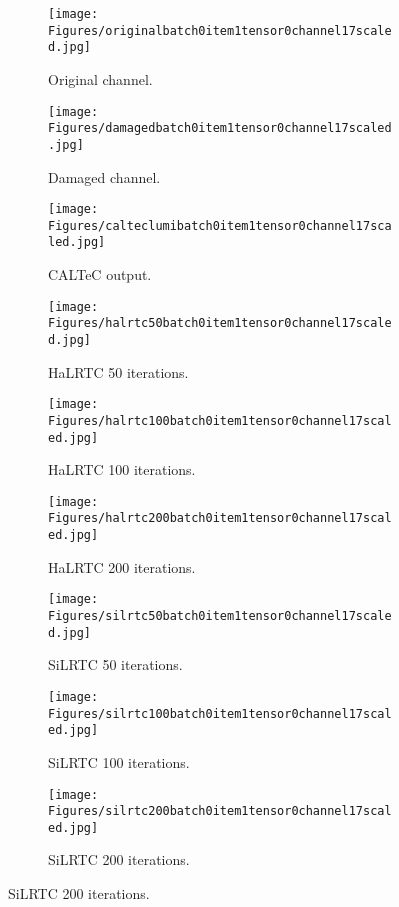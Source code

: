 \begin{figure}[H]
	\centering
	\begin{subfigure}{.32\linewidth}
		\centering
		\texttt{[image: Figures/originalbatch0item1tensor0channel17scaled.jpg]}
		\caption{Original channel.}
	\end{subfigure}%
	\hfill
	\begin{subfigure}{.32\textwidth}
		\centering
		\texttt{[image: Figures/damagedbatch0item1tensor0channel17scaled.jpg]}
		\caption{Damaged channel.}
	\end{subfigure}
	\hfill 
	\begin{subfigure}{.32\textwidth}
		\centering
		\texttt{[image: Figures/calteclumibatch0item1tensor0channel17scaled.jpg]}
		\caption{CALTeC output.}
	\end{subfigure}
	
	\begin{subfigure}{.32\textwidth}
		\centering
		\texttt{[image: Figures/halrtc50batch0item1tensor0channel17scaled.jpg]}
		\caption{HaLRTC 50 iterations.}
	\end{subfigure}
	\hfill 
	\begin{subfigure}{.32\textwidth}
		\centering
		\texttt{[image: Figures/halrtc100batch0item1tensor0channel17scaled.jpg]}
		\caption{HaLRTC 100 iterations.}
	\end{subfigure}
	\hfill
	\begin{subfigure}{.32\textwidth}
		\centering
		\texttt{[image: Figures/halrtc200batch0item1tensor0channel17scaled.jpg]}
		\caption{HaLRTC 200 iterations.}
	\end{subfigure}
	
	\begin{subfigure}{.32\textwidth}
		\centering
		\texttt{[image: Figures/silrtc50batch0item1tensor0channel17scaled.jpg]}
		\caption{SiLRTC 50 iterations.}
	\end{subfigure}
	\hfill 
	\begin{subfigure}{.32\textwidth}
		\centering
		\texttt{[image: Figures/silrtc100batch0item1tensor0channel17scaled.jpg]}
		\caption{SiLRTC 100 iterations.}
	\end{subfigure}
	\hfill
	\begin{subfigure}{.32\textwidth}
		\centering
		\texttt{[image: Figures/silrtc200batch0item1tensor0channel17scaled.jpg]}
		\caption{SiLRTC 200 iterations.}
	\end{subfigure}
	

\end{figure}
